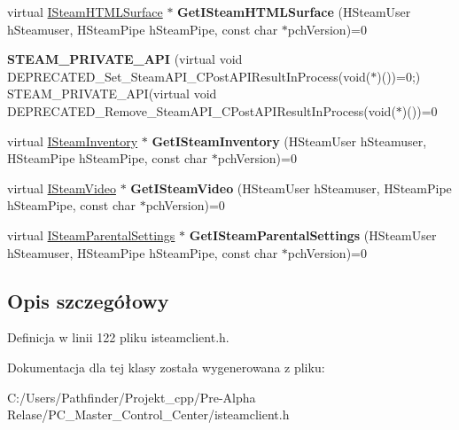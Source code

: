 \begin{DoxyCompactItemize}
\item 
\mbox{\label{class_i_steam_client_a6a1eb108665dc05f2ce7916944ddf2a1}} 
virtual \hyperlink{class_i_steam_h_t_m_l_surface}{I\+Steam\+H\+T\+M\+L\+Surface} $\ast$ {\bfseries Get\+I\+Steam\+H\+T\+M\+L\+Surface} (H\+Steam\+User h\+Steamuser, H\+Steam\+Pipe h\+Steam\+Pipe, const char $\ast$pch\+Version)=0
\item 
\mbox{\label{class_i_steam_client_ab869c7c8c8ca8586e519531c57974ef4}} 
{\bfseries S\+T\+E\+A\+M\+\_\+\+P\+R\+I\+V\+A\+T\+E\+\_\+\+A\+PI} (virtual void D\+E\+P\+R\+E\+C\+A\+T\+E\+D\+\_\+\+Set\+\_\+\+Steam\+A\+P\+I\+\_\+\+C\+Post\+A\+P\+I\+Result\+In\+Process(void($\ast$)())=0;) S\+T\+E\+A\+M\+\_\+\+P\+R\+I\+V\+A\+T\+E\+\_\+\+A\+PI(virtual void D\+E\+P\+R\+E\+C\+A\+T\+E\+D\+\_\+\+Remove\+\_\+\+Steam\+A\+P\+I\+\_\+\+C\+Post\+A\+P\+I\+Result\+In\+Process(void($\ast$)())=0
\item 
\mbox{\label{class_i_steam_client_a19f151e23cab90e10a7a87f88488dd3b}} 
virtual \hyperlink{class_i_steam_inventory}{I\+Steam\+Inventory} $\ast$ {\bfseries Get\+I\+Steam\+Inventory} (H\+Steam\+User h\+Steamuser, H\+Steam\+Pipe h\+Steam\+Pipe, const char $\ast$pch\+Version)=0
\item 
\mbox{\label{class_i_steam_client_a977b955b16685e80756acbe20ecfe277}} 
virtual \hyperlink{class_i_steam_video}{I\+Steam\+Video} $\ast$ {\bfseries Get\+I\+Steam\+Video} (H\+Steam\+User h\+Steamuser, H\+Steam\+Pipe h\+Steam\+Pipe, const char $\ast$pch\+Version)=0
\item 
\mbox{\label{class_i_steam_client_a3b38589cbd81dbcf79a8aa9d7a959fc0}} 
virtual \hyperlink{class_i_steam_parental_settings}{I\+Steam\+Parental\+Settings} $\ast$ {\bfseries Get\+I\+Steam\+Parental\+Settings} (H\+Steam\+User h\+Steamuser, H\+Steam\+Pipe h\+Steam\+Pipe, const char $\ast$pch\+Version)=0
\end{DoxyCompactItemize}


\subsection{Opis szczegółowy}


Definicja w linii 122 pliku isteamclient.\+h.



Dokumentacja dla tej klasy została wygenerowana z pliku\+:\begin{DoxyCompactItemize}
\item 
C\+:/\+Users/\+Pathfinder/\+Projekt\+\_\+cpp/\+Pre-\/\+Alpha Relase/\+P\+C\+\_\+\+Master\+\_\+\+Control\+\_\+\+Center/isteamclient.\+h\end{DoxyCompactItemize}
